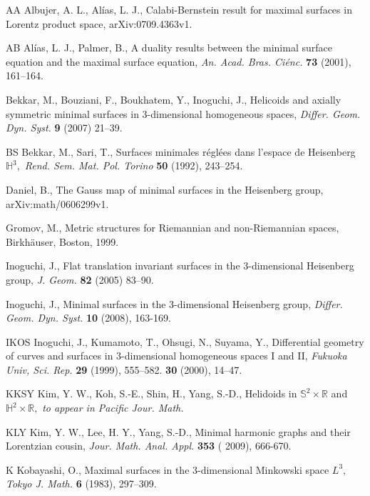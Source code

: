 \documentclass[11pt]{amsart}
\begin{document}
\begin{thebibliography}{9}

\bibitem
{AA} Albujer, A. L., Al\'{i}as, L. J., Calabi-Bernstein
result for maximal surfaces in Lorentz product space,
arXiv:0709.4363v1.

\bibitem
{AB} Al\'{i}as, L. J., Palmer, B., A duality results between the
minimal surface equation and the maximal surface equation,
\textsl{An. Acad. Bras. Ci\'{e}nc.} \textbf{73} (2001), 161--164.

 Bekkar, M., Bouziani, F., Boukhatem, Y., Inoguchi,
J., Helicoids and axially symmetric minimal surfaces in
3-dimensional homogeneous spaces, \textsl{Differ. Geom. Dyn.
Syst.} \textbf{9} (2007) 21--39.

\bibitem
{BS} Bekkar, M., Sari, T., Surfaces minimales r\'{e}gl\'{e}es dans
l'espace de Heisenberg ${\mathbb{H}}^3,$
 \textsl{Rend. Sem. Mat. Pol. Torino}
\textbf{50} (1992), 243--254.

  Daniel, B., The Gauss map of minimal surfaces in the
Heisenberg group, arXiv:math/0606299v1.

  Gromov, M., Metric structures for Riemannian and non-Riemannian spaces, Birkh\"{a}user, Boston,
1999.

  Inoguchi, J., Flat translation invariant
surfaces in the 3-dimensional Heisenberg group, \textsl{J. Geom.}
\textbf{82} (2005) 83--90.

 Inoguchi, J., Minimal surfaces in the
3-dimensional Heisenberg group, \textsl{Differ. Geom. Dyn. Syst.}
\textbf{10} (2008), 163-169.

\bibitem
{IKOS}
Inoguchi, J., Kumamoto, T., Ohsugi, N., Suyama, Y., Differential
geometry of curves and surfaces in 3-dimensional homogeneous
spaces I and II, \textsl{Fukuoka Univ, Sci. Rep.} \textbf{29}
(1999), 555--582. \textbf{30} (2000), 14--47.

\bibitem
{KKSY} Kim, Y. W., Koh, S.-E., Shin, H., Yang, S.-D., Helidoids in
${\mathbb{S}}^2\times{\mathbb{R}}$ and ${\mathbb{H}}^2\times{\mathbb{R}},$ \textsl{to appear in
Pacific Jour. Math.}

\bibitem
{KLY} Kim, Y. W., Lee, H. Y., Yang, S.-D., Minimal harmonic graphs
and their Lorentzian cousin, \textsl{Jour. Math. Anal. Appl.}
\textbf{353} ( 2009),  666-670.

\bibitem
{K} Kobayashi, O., Maximal surfaces in the 3-dimensional Minkowski
space $L^3,$ \textsl{Tokyo J. Math.} \textbf{6} (1983), 297--309.


\end{thebibliography}
\end{document}
